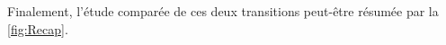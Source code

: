 \subparagraph{}Finalement, l'étude comparée de ces deux transitions peut-être résumée par la \autoref{fig:Recap}.

%
%
